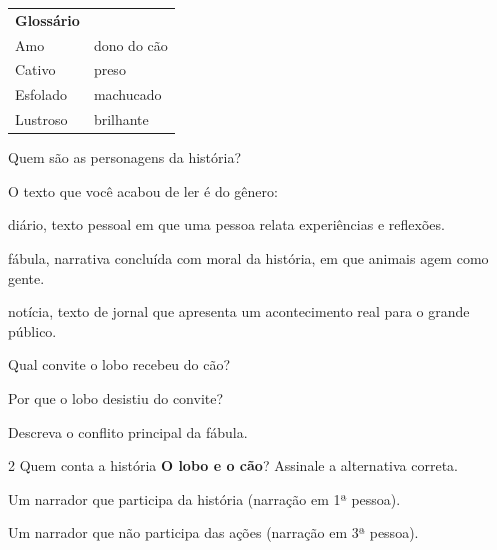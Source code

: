 \begin{tabular}{ll}
\textbf{Glossário} & \mbox{}\\
Amo & dono do cão\\
Cativo & preso\\
Esfolado & machucado\\
Lustroso & brilhante\\
\end{tabular}

\begin{escolha}
\item Quem são as personagens da história?


\item O texto que você acabou de ler é do gênero:

\begin{boxlist}
 diário, texto pessoal em que uma pessoa relata experiências e reflexões.

 fábula, narrativa concluída com moral da história, em que animais agem como gente.

 notícia, texto de jornal que apresenta um acontecimento real para o grande público.
\end{boxlist}

\item Qual convite o lobo recebeu do cão?


\item Por que o lobo desistiu do convite?


\item Descreva o conflito principal da fábula.

\end{escolha}

\num{2} Quem conta a história \textbf{O lobo e o cão}? Assinale a alternativa correta.

\begin{boxlist}
 Um narrador que participa da história (narração em 1ª pessoa).

 Um narrador que não participa das ações (narração em 3ª pessoa).
\end{boxlist}

